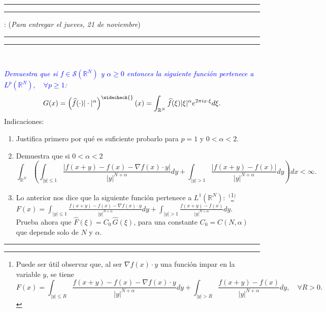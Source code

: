 \documentclass[11pt,a4paper]{article}
\newcommand{\blue}{\textcolor{blue}}
\begin{document}
\hrule\hrule
\vspace{2mm}


\vspace{3mm}

 : \hfill ({\small \it Para entregar el jueves, 21 de noviembre})

\vspace{2mm}

\hrule\hrule

\vspace{2mm}

\

 \blue{\em Demuestra que si $f\in\mathscr{S}(\mathbb R^N)$ y $\alpha\ge 0$ entonces la siguiente función pertenece a   $L^p(\mathbb R^N), \quad \forall p\ge 1$:
$$
G(x)=\left(\widehat f(\cdot)|\cdot|^\alpha\right)^{\widecheck{}}(x)=\int_{\mathbb R^N}
\widehat f(\xi)|\xi|^\alpha e^{2\pi ix\cdot\xi}d\xi.
$$}
\vskip -2mm
{\sc Indicaciones}: 
\begin{enumerate}
\item Justifica primero por qué es suficiente probarlo para  $p=1$ y $0<\alpha<2$. 
\item Demuestra que si $0<\alpha<2$ 
$$\displaystyle\int_{\mathbb R^N}\left(\int_{|y|\le 1}\frac{|f(x+y)-f(x)-\nabla f(x)\cdot y|}{|y|^{N+\alpha}}dy+
\int_{|y|>1}\frac{|f(x+y)-f(x)|}{|y|^{N+\alpha}}dy\right)dx<\infty.$$ 

\item  Lo anterior nos dice que la siguiente función  pertenece a $L^1(\mathbb R^N):$ ${}^($\footnote{ Puede ser útil observar que, al ser 
$\nabla f(x)\cdot y$ una función impar en la variable  $y$, se tiene $$F(x)=\displaystyle\int_{|y|\le R}\frac{f(x+y)-f(x)-\nabla f(x)\cdot y}{|y|^{N+\alpha}}dy+
\int_{|y|>R}\frac{f(x+y)-f(x)}{|y|^{N+\alpha}}dy, \quad \forall R>0.$$}${}^)$
 \\[2mm]
$F(x)=\displaystyle\int_{|y|\le 1}\frac{f(x+y)-f(x)-\nabla f(x)\cdot y}{|y|^{N+\alpha}}dy+
\int_{|y|>1}\frac{f(x+y)-f(x)}{|y|^{N+\alpha}}dy.$    \\[1mm]
Prueba ahora que $\widehat F(\xi)=C_0\,\widehat G(\xi)$, para una constante $C_0=C(N,\alpha)$ que depende solo de  $N$ y $\alpha$.
\end{enumerate}
\vskip 6mm
\hrule
\vskip 5mm


 
 
\end{document}
